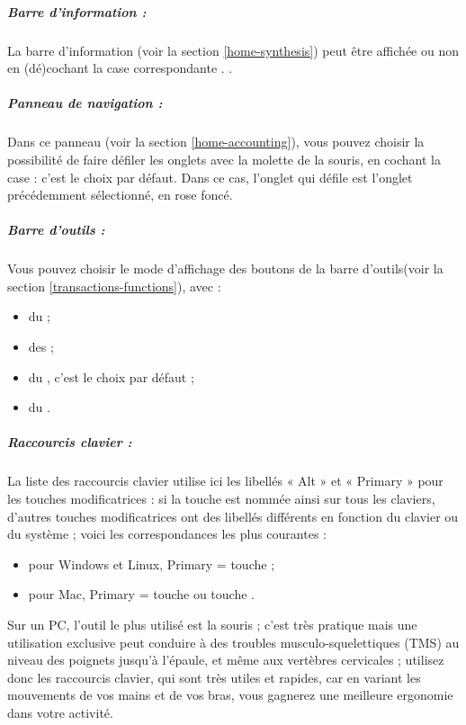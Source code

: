 \subparagraph{Barre d'information :}

La barre d'information (voir la section \vref{home-synthesis}) peut être affichée ou non en (dé)cochant la case correspondante . .

\subparagraph{Panneau de navigation :}

Dans ce panneau  (voir la section \vref{home-accounting}), vous pouvez choisir la possibilité de faire défiler les onglets avec la molette de la souris, en cochant la case  : c'est le choix par défaut. Dans ce cas, l'onglet qui défile est l'onglet précédemment sélectionné, en rose foncé{\couleur}.


\subparagraph{Barre d'outils :}

Vous pouvez choisir le mode d'affichage des boutons de la barre d'outils(voir la section \vref{transactions-functions}), avec :
\begin{itemize}
	\item du  ;
	\item des  ;
	\item du , c'est le choix par défaut ;
	\item du .
\end{itemize}




\subparagraph{Raccourcis clavier :}

La liste des raccourcis clavier utilise ici les libellés « Alt » et « Primary » pour les touches modificatrices : si la touche  est nommée ainsi sur tous les claviers, d'autres touches modificatrices ont des libellés différents en fonction du clavier ou du système ; voici les correspondances les plus courantes :

\begin{itemize}
	\item pour Windows et Linux, Primary = touche  ;
	\item pour Mac, Primary = touche  ou touche .
\end{itemize}

Sur un PC, l'outil le plus utilisé est la souris ; c'est très pratique mais une utilisation exclusive peut conduire à des troubles musculo-squelettiques (TMS) au niveau des poignets jusqu'à l'épaule, et même aux vertèbres cervicales ; utilisez donc les raccourcis clavier, qui sont très utiles et rapides, car en variant les mouvements de vos mains et de vos bras, vous gagnerez une meilleure ergonomie dans votre activité.


